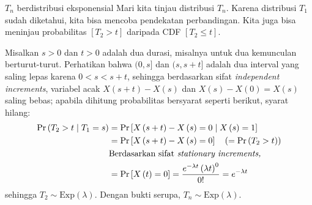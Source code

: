 \documentclass{beamer}
\newcommand{\pars}[1]{\left(#1\right)}
\newcommand{\brackets}[1]{\left[#1\right]}
\begin{document}
\begin{frame}{\(T_n\) berdistribusi eksponensial}
    Mari kita tinjau distribusi \(T_n\). Karena distribusi \(T_1\) sudah diketahui, kita bisa mencoba pendekatan perbandingan. Kita juga bisa meninjau probabilitas \(\brackets{T_2 > t}\) daripada CDF \(\brackets{T_2 \le t}\).
    
    Misalkan \(s > 0\) dan \(t > 0\) adalah dua durasi, misalnya untuk dua kemunculan berturut-turut. Perhatikan bahwa \( (0,s] \) dan \( (s, s+t] \) adalah dua interval yang saling lepas karena \( 0 < s < s+t \), sehingga berdasarkan sifat \textit{independent increments}, variabel acak \(X\pars{s+t} - X\pars{s}\) dan \(X\pars{s} - X\pars{0} = X\pars{s}\) saling bebas; 
    apabila dihitung probabilitas bersyarat seperti berikut, syarat hilang:
    \begin{align*}
        \text{Pr}\pars{T_2 > t \; \middle| \; T_1 = s} &= \text{Pr}\brackets{X\pars{s+t} - X\pars{s} = 0 \; \middle| \; X\pars{s} = 1 } \\
        &= \text{Pr}\brackets{X\pars{s+t} - X\pars{s} = 0} \quad \pars{= \text{Pr}\pars{T_2 > t}} \\
        &\text{Berdasarkan sifat \textit{stationary increments,}} \\
        &= \text{Pr}\brackets{X\pars{t} = 0} = \frac{e^{-\lambda t} \pars{\lambda t}^0}{0!} = e^{-\lambda t}
    \end{align*}
    sehingga \(T_2 \sim \text{Exp}(\lambda)\). Dengan bukti serupa, \(T_n \sim \text{Exp}(\lambda)\).
\end{frame}
\end{document}
